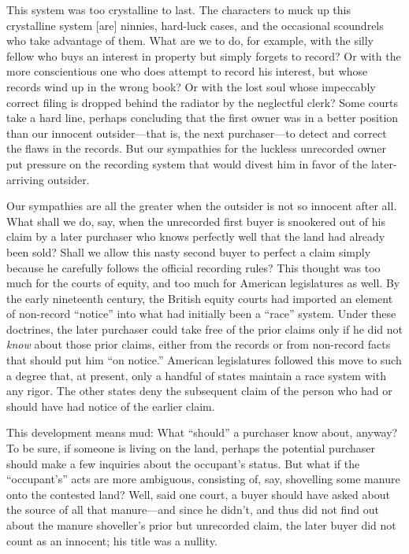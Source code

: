 This system was too crystalline to last. The characters to muck up this
crystalline system [are] ninnies, hard-luck cases, and the occasional
scoundrels who take advantage of them. What are we to do, for example, with the
silly fellow who buys an interest in property but simply forgets to record? Or
with the more conscientious one who does attempt to record his interest, but
whose records wind up in the wrong book? Or with the lost soul whose impeccably
correct filing is dropped behind the radiator by the neglectful clerk? Some
courts take a hard line, perhaps concluding that the first owner was in a
better position than our innocent outsider---that is, the next purchaser---to
detect and correct the flaws in the records. But our sympathies for the
luckless unrecorded owner put pressure on the recording system that would
divest him in favor of the later-arriving outsider.

Our sympathies are all the greater when the outsider is not so innocent after
all. What shall we do, say, when the unrecorded first buyer is snookered out of
his claim by a later purchaser who knows perfectly well that the land had
already been sold? Shall we allow this nasty second buyer to perfect a claim
simply because he carefully follows the official recording rules? This thought
was too much for the courts of equity, and too much for American legislatures
as well. By the early nineteenth century, the British equity courts had
imported an element of non-record ``notice'' into what had initially been a
``race'' system. Under these doctrines, the later purchaser could take free of
the prior claims only if he did not \textit{know} about those prior claims,
either from the records or from non-record facts that should put him ``on
notice.'' American legislatures followed this move to such a degree that, at
present, only a handful of states maintain a race system with any rigor. The
other states deny the subsequent claim of the person who had or should have had
notice of the earlier claim. 

This development means mud: What ``should'' a purchaser know about, anyway? To
be
sure, if someone is living on the land, perhaps the potential purchaser should
make a few inquiries about the occupant's status. But what if the ``occupant's''
acts are more ambiguous, consisting of, say, shovelling some manure onto the
contested land? Well, said one court, a buyer should have asked about the
source of all that manure---and since he didn't, and thus did not find out
about the manure shoveller's prior but unrecorded claim, the later buyer did
not count as an innocent; his title was a nullity. 

